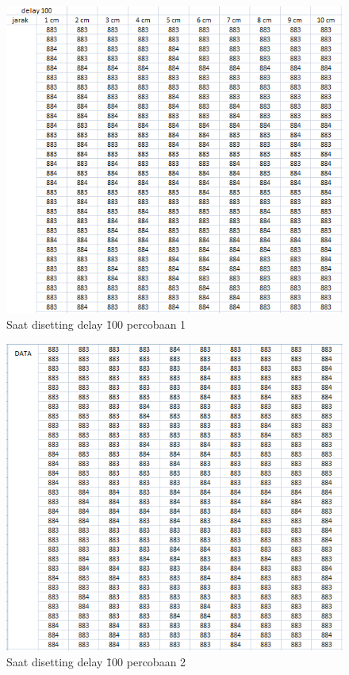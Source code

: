  \begin{figure}[!htbp]
  \centering
  \includegraphics[width=.75\textwidth]{figures/build/delay_100_1.png}
  \caption{Saat disetting delay \= 100 percobaan 1}\label{fig:1001}
\end{figure}

 \begin{figure}[!htbp]
  \centering
  \includegraphics[width=.75\textwidth]{figures/build/delay_100_2.png}
  \caption{Saat disetting delay \= 100 percobaan 2}\label{fig:1002}
\end{figure}
